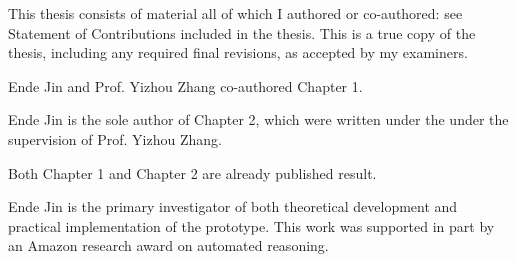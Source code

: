 


\vspace*{\fill}
\begin{center}
  \textsc{\Huge \thetitle}
\end{center}


\vspace*{\fill}

\newpage

\setcounter{page}{1}

\vspace*{\fill}


This thesis consists of material all of which I authored or co-authored: see Statement of Contributions included in the thesis. This is a true copy of the thesis, including any required final revisions, as accepted by my examiners.

\vspace*{\fill}

\newpage 


\vspace*{\fill}


Ende Jin and Prof. Yizhou Zhang co-authored Chapter 1.

Ende Jin is the sole author of Chapter 2, which were written under the  under the supervision of Prof. Yizhou Zhang.

Both Chapter 1 and Chapter 2 are already published result.

 Ende Jin is the primary investigator of both theoretical development and practical implementation of the prototype. This work was supported in part by an Amazon research award on automated
reasoning.

\vspace*{\fill}

\newpage


\vspace*{\fill}


\vspace*{\fill}


\newpage


\vspace*{\fill}

